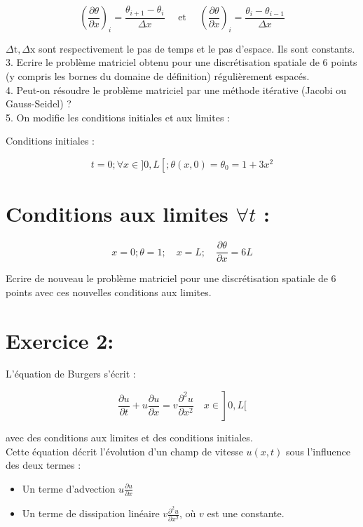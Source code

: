 \documentclass[10pt]{article}
\begin{document}
\[
\left(\frac{\partial \theta}{\partial x}\right)_{i}=\frac{\theta_{i+1}-\theta_{i}}{\Delta x} \quad \text { et } \quad\left(\frac{\partial \theta}{\partial x}\right)_{i}=\frac{\theta_{i}-\theta_{i-1}}{\Delta x}
\]

\(\Delta \mathrm{t}, \Delta \mathrm{x}\) sont respectivement le pas de temps et le pas d'espace. Ils sont constants.\\
3. Ecrire le problème matriciel obtenu pour une discrétisation spatiale de 6 points (y compris les bornes du domaine de définition) régulièrement espacés.\\
4. Peut-on résoudre le problème matriciel par une méthode itérative (Jacobi ou Gauss-Seidel) ?\\
5. On modifie les conditions initiales et aux limites :

Conditions initiales :

\[
t=0 ; \forall x \in] 0, L\left[; \theta(x, 0)=\theta_{0}=1+3 x^{2}\right.
\]

\section*{Conditions aux limites \(\forall t\) :}
\[
x=0 ; \theta=1 ; \quad x=L ; \quad \frac{\partial \theta}{\partial x}=6 L
\]

Ecrire de nouveau le problème matriciel pour une discrétisation spatiale de 6 points avec ces nouvelles conditions aux limites.

\section*{Exercice 2:}
L'équation de Burgers s'écrit :

\[
\left.\frac{\partial u}{\partial t}+u \frac{\partial u}{\partial x}=v \frac{\partial^{2} u}{\partial x^{2}} \quad x \in\right] 0, L[
\]

avec des conditions aux limites et des conditions initiales.\\
Cette équation décrit l'évolution d'un champ de vitesse \(u(x, t)\) sous l'influence des deux termes :

\begin{itemize}
  \item Un terme d'advection \(u \frac{\partial u}{\partial x}\)
  \item Un terme de dissipation linéaire \(v \frac{\partial^{2} u}{\partial x^{2}}\), où \(v\) est une constante.
\end{itemize}
\end{document}
